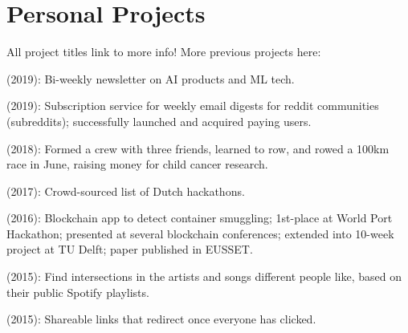 \documentclass[]{deedy-resume-openfont}
\begin{document}
\begin{minipage}[t]{0.66\textwidth}


\section{Personal Projects}

All project titles link to more info! More previous projects here: \href{http://leonoverweel.com/}{}

\begin{tightemize}
    \item \href{https://www.getrevue.co/profile/dynamically-typed}{} (2019): Bi-weekly newsletter on AI products and ML tech.
    \item \href{https://weekly.cool}{} (2019): Subscription service for weekly email digests for reddit communities (subreddits); successfully launched and acquired paying users.
    \item \href{http://keihardroeien.nl/}{} (2018): Formed a crew with three friends, learned to row, and rowed a 100km race in June, raising money for child cancer research.
    \item \href{http://hackathonlist.nl/}{} (2017): Crowd-sourced list of Dutch hackathons.
    \item \href{http://leonoverweel.com/world-port-hackathon-2016}{} (2016): Blockchain app to detect container smuggling; 1st-place at World Port Hackathon; presented at several blockchain conferences; extended into 10-week project at TU Delft; paper published in EUSSET.
    \item \href{http://leonoverweel.com/intersect.ninja}{} (2015): Find intersections in the artists and songs different people like, based on their public Spotify playlists.
    \item \href{http://leonoverweel.com/link-syncer}{} (2015): Shareable links that redirect once everyone has clicked. 
\end{tightemize}


\end{minipage}
\end{document}

